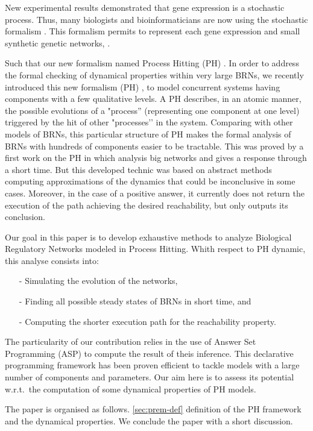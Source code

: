 New experimental results \cite{elowitz2002stochastic} \cite{blake2003noise} demonstrated that gene expression is a stochastic process. Thus, many biologists and bioinformaticians are now using the stochastic formalism \cite{arkin1998stochastic, tian2006stochastic, wang2010robust}. This formalism permits to represent each gene expression \cite{raser2005noise} and small synthetic genetic networks, \cite{elowitz2000synthetic} \cite{gardner2000construction}.

 Such that our new formalism named Process Hitting (PH) \cite{PMR10-TCSB}. In order to address the formal checking of dynamical properties within very large BRNs, we recently introduced this new formalism (PH) \cite{PMR10-TCSB}, to model concurrent systems having components with a few qualitative levels. A PH describes, in an atomic manner, the possible evolutions of a "process'' (representing one component at one level) triggered by the hit of other "processes’’ in the system. Comparing with other models of BRNs, this particular structure of PH makes the formal analysis of BRNs with hundreds of components easier to be tractable. This was proved by a first work on the PH in \cite{PMR12-MSCS} which analysis big networks and gives a response through a short time. But this developed technic was based on abstract methods computing approximations of the dynamics that could be inconclusive in some cases. Moreover, in the case of a positive answer, it currently does not return the execution of the path achieving the desired reachability, but only outputs its conclusion.

Our goal in this paper is to develop exhaustive methods to analyze Biological Regulatory Networks modeled in Process Hitting. Whith respect to PH dynamic, this analyse consists into:
\begin{itemize}
\item[-] Simulating the evolution of the networks,
\item[-] Finding all possible steady states of BRNs in short time, and
\item[-] Computing the shorter execution path for the reachability property.
\end{itemize}

 The particularity of our contribution relies in the use of Answer Set Programming
(ASP) \cite{baral2003knowledge}
to compute the result of theis inference.
This declarative programming framework has been proven efficient
to tackle models with a large number of components and parameters.
Our aim here is to assess its potential w.r.t.\ the computation
of some dynamical properties of PH models.

The paper is organised as follows. \ref{sec:prem-def} definition of the PH framework and the dynamical properties. %
We conclude the paper with a short discussion. 